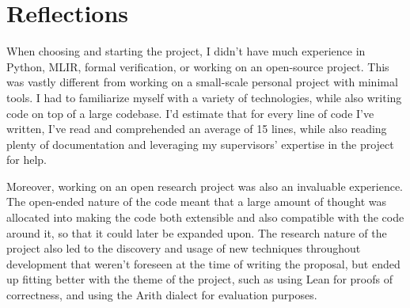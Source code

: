 \section{Reflections}

When choosing and starting the project, I didn't have much experience in Python, 
MLIR, formal verification, or working on an open-source project. This was
vastly different from working on a small-scale personal project with minimal tools.
I had to familiarize myself with a variety of technologies, while also writing code
on top of a large codebase. I'd estimate that for every line of code I've written,
I've read and comprehended an average of 15 lines, while also reading plenty of 
documentation and leveraging my supervisors' expertise in the project for help.

Moreover, working on an open research project was also an invaluable experience. The
open-ended nature of the code meant that a large amount of thought was allocated into
making the code both extensible and also compatible with the code around it, so that 
it could later be expanded upon. The research nature of the project also led to 
the discovery and usage of new techniques throughout development that weren't foreseen
at the time of writing the proposal, but ended up fitting better with the theme of
the project, such as using Lean for proofs of correctness, and using the Arith dialect
for evaluation purposes.
